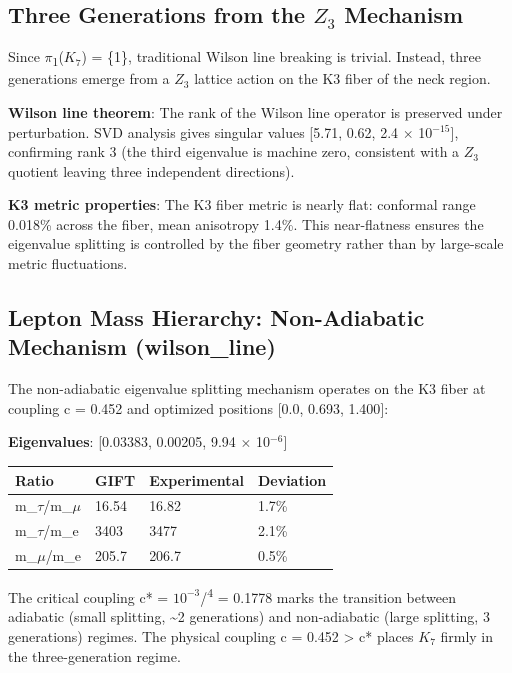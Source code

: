 \documentclass[11pt,a4paper]{article}
\begin{document}
\subsection{\texorpdfstring{Three Generations from the \(Z_{3}\)
Mechanism}{Three Generations from the Z\_\{3\} Mechanism}}\label{three-generations-from-the-z_3-mechanism}

Since \(\pi\)\textsubscript{1}(\(K_{7}\)) = \{1\}, traditional Wilson
line breaking is trivial. Instead, three generations emerge from a
\(Z_{3}\) lattice action on the K3 fiber of the neck region.

\textbf{Wilson line theorem}: The rank of the Wilson line operator is
preserved under perturbation. SVD analysis gives singular values
{[}5.71, 0.62, 2.4 \(\times\) 10\(^{-15}\){]}, confirming rank 3 (the
third eigenvalue is machine zero, consistent with a \(Z_{3}\) quotient
leaving three independent directions).

\textbf{K3 metric properties}: The K3 fiber metric is nearly flat:
conformal range 0.018\% across the fiber, mean anisotropy 1.4\%. This
near-flatness ensures the eigenvalue splitting is controlled by the
fiber geometry rather than by large-scale metric fluctuations.

\subsection{Lepton Mass Hierarchy: Non-Adiabatic Mechanism (wilson\_line)}

The non-adiabatic eigenvalue splitting mechanism operates on the K3
fiber at coupling c = 0.452 and optimized positions {[}0.0, 0.693,
1.400{]}:

\textbf{Eigenvalues}: {[}0.03383, 0.00205, 9.94 \(\times\)
10\(^{-6}\){]}

\begin{longtable}[]{@{}llll@{}}
\toprule\noalign{}
Ratio & GIFT & Experimental & Deviation \\
\midrule\noalign{}
\endhead
\bottomrule\noalign{}
\endlastfoot
m\_\(\tau\)/m\_\(\mu\) & 16.54 & 16.82 & 1.7\% \\
m\_\(\tau\)/m\_e & 3403 & 3477 & 2.1\% \\
m\_\(\mu\)/m\_e & 205.7 & 206.7 & 0.5\% \\
\end{longtable}


The critical coupling c* = \(10^{-3}\)/\textsuperscript{4} = 0.1778
marks the transition between adiabatic (small splitting,
\textasciitilde2 generations) and non-adiabatic (large splitting, 3
generations) regimes. The physical coupling c = 0.452 \textgreater{} c*
places \(K_{7}\) firmly in the three-generation regime.
\end{document}
